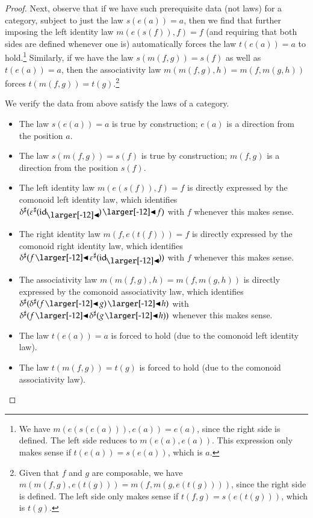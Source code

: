 \documentclass{amsart}
\begin{document}
\begin{proof}
  Next, observe that if we have such prerequisite data (not laws) for
  a category, subject to just the law $s(e(a)) = a$, then we find that
  further imposing the left identity law $m(e(s(f)), f) = f$
  (and requiring that both sides are defined whenever one is)
  automatically forces the law $t(e(a)) = a$ to hold.\footnote{We have
    $m(e(s(e(a))), e(a)) = e(a)$, since the right side is defined. The
    left side reduces to $m(e(a), e(a))$. This expression only makes
    sense if $t(e(a)) = s(e(a))$, which is $a$.}  Similarly, if we
  have the law $s(m(f,g))=s(f)$ as well as $t(e(a)) = a$, then the
  associativity law $m(m(f,g),h) = m(f,m(g,h))$ forces
  $t(m(f,g)) = t(g)$.\footnote{Given that $f$ and $g$ are composable,
    we have $m(m(f,g),e(t(g))) = m(f,m(g,e(t(g))))$, since the right
    side is defined. The left side only makes sense if
    $t(f,g) = s(e(t(g)))$, which is $t(g)$.}

  We verify the data from above satisfy the laws of a category.
  \begin{itemize}
  \item The law $s(e(a)) = a$ is true by construction; $e(a)$ is a
    direction from the position $a$.
  \item The law $s(m(f, g)) = s(f)$ is true by construction; $m(f, g)$
    is a direction from the position $s(f)$.
  \item The left identity law $m(e(s(f)), f) = f$ is directly
    expressed by the comonoid left identity law, which identifies
    ${\anydirmapof{\delta}{\anydirmapof{\varepsilon}{\idsubd} \subd f}}$
    with $f$ whenever this makes sense.\iffalse\footnote{Meaning,
        there are $u$ and $v$ such that
        ${\dirmapof{\delta}{u}{\dirmapof{\varepsilon}{v}{\idsubd} \subd
            f}}$ specifies a direction from position $a$ $\iff$ $f$
        specifies a direction from position $a$; in this case, the
        former and latter are equal.}\fi
  \item The right identity law $m(f, e(t(f))) = f$ is directly
    expressed by the comonoid right identity law, which identifies
    ${\anydirmapof{\delta}{f \subd \anydirmapof{\varepsilon}{\idsubd}}}$
    with $f$ whenever this makes sense.
  \item The associativity law $m(m(f, g), h) = m(f, m(g, h))$ is
    directly expressed by the comonoid associativity law, which
    identifies
    ${\anydirmapof{\delta}{\anydirmapof{\delta}{f \subd g} \subd h}}$ with
    ${\anydirmapof{\delta}{f \subd \anydirmapof{\delta}{g \subd h}}}$ whenever this makes sense.
  \item The law $t(e(a)) = a$ is forced to hold (due to the comonoid
    left identity law).
  \item The law $t(m(f, g)) = t(g)$ is forced to hold (due to the
    comonoid associativity law).
  \end{itemize}


\end{proof}
\end{document}
